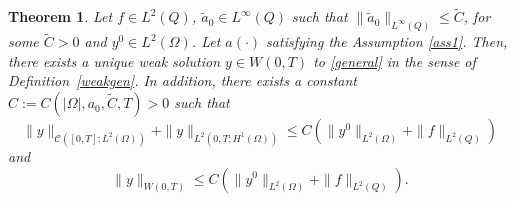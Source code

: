 \documentclass[reqno,twoside]{amsart}
\numberwithin{equation}{section}
\newtheorem{theorem}{Theorem}[section]
\theoremstyle{definition}
\numberwithin{equation}{section}
\def \C {\mathcal{C}}
\def \C {{\mathcal C}}
\def \C {\mathcal{C}}
\def \C {{\mathcal C}}
\begin{document}
\begin{theorem}\label{theoremexistence}
	Let $f\in L^2(Q)$, $\tilde{a}_0\in L^\infty(Q)$ such that $\|\tilde{a}_0\|_{L^\infty(Q)}\leq \tilde{C}$, for some $\tilde{C}>0$ and $y^{0}\in L^2(\Omega)$. Let $a(\cdot)$ satisfying the Assumption \ref{ass1}.  Then, there exists a unique weak solution $y \in W(0,T)$ to \eqref{general} in the sense of Definition~\ref{weakgen}.
	In addition, there exists a constant $C:=C(|\Omega|,a_0,\tilde{C},T)>0$ such that
	\begin{equation}\label{estimationgen}
		\|y\|_{\C([0,T];L^2(\Omega))}+ \|y\|_{L^2(0,T;H^1(\Omega))} \leq C\left(\|y^0\|_{L^2(\Omega)}+\|f\|_{L^2(Q)}\right)
	\end{equation}
	and
	\begin{equation}\label{estimationge}
		\|y\|_{W(0,T)}\leq C\left(\|y^0\|_{L^2(\Omega)}+\|f\|_{L^2(Q)}\right).
	\end{equation}
\end{theorem}
\end{document}
